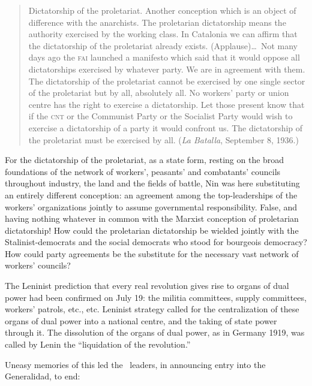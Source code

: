 \begin{quotation}
  Dictatorship of the proletariat. Another conception which is an object of difference with the anarchists. The proletarian dictatorship means the authority exercised by the working class. In Catalonia we can affirm that the dictatorship of the proletariat already exists. (Applause)\dots\ Not many days ago the \textsc{fai} launched a manifesto which said that it would oppose all dictatorships exercised by whatever party. We are in agreement with them. The dictatorship of the proletariat cannot be exercised by one single sector of the proletariat but by all, absolutely all. No workers’ party or union centre has the right to exercise a dictatorship. Let those present know that if the \textsc{cnt} or the Communist Party or the Socialist Party would wish to exercise a dictatorship of a party it would confront us. The dictatorship of the proletariat must be exercised by all. (\emph{La Batalla}, September 8, 1936.)
\end{quotation}

\vspace{-0.25\baselineskip}

For the dictatorship of the proletariat, as a state form, resting on the broad foundations of the network of workers’, peasants’ and combatants’ councils throughout industry, the land and the fields of battle, Nin was here substituting an entirely different conception: an agreement among the top-leaderships of the workers’ organizations jointly to assume governmental responsibility. False, and having nothing whatever in common with the Marxist conception of proletarian dictatorship! How could the proletarian dictatorship be wielded jointly with the Stalinist-democrats and the social democrats who stood for bourgeois democracy? How could party agreements be the substitute for the necessary vast network of workers’ councils?

The Leninist prediction that every real revolution gives rise to organs of dual power had been confirmed on July 19: the militia committees, supply committees, workers’ patrols, etc., etc. Leninist strategy called for the centralization of these organs of dual power into a national centre, and the taking of state power through it. The dissolution of the organs of dual power, as in Germany 1919, was called by Lenin the ``liquidation of the revolution.''

Uneasy memories of this led the \POUM\ leaders, in announcing entry into the Generalidad, to end:

\vspace{-0.25\baselineskip}

